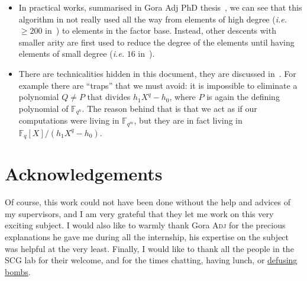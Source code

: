 \documentclass[a4paper,11pt]{article}
\theoremstyle{break}
\theoremstyle{sc}
\theoremstyle{definition}
\theoremstyle{remark}
\newcommand{\ie}{\emph{i.e. }}
\begin{document}
\begin{itemize}
  \item In practical works, summarised in Gora Adj PhD thesis~\cite{Adj16}, we
    can see that this algorithm in not really used all the way from elements
    of high degree (\ie $\geq 200$ in~\cite{Adj16}) to elements in the factor base. Instead, other descents
    with smaller arity are first used to reduce the degree of the elements
    until having elements of small degree (\ie $16$ in~\cite{Adj16}).
  \item There are technicalities hidden in this document, they are discussed
    in~\cite{GKZ14}. For example there are ``traps'' that we must avoid: it is
    impossible to eliminate a polynomial $Q\neq P$ that divides
    $h_1X^q-h_0$, where $P$ is again the defining polynomial of
    $\mathbb{F}_{q^n}$. The reason behind that is that we act as if our
    computations were living in $\mathbb{F}_{q^m}$, but they are in fact living
    in $\mathbb{F}_{q}[X]/(h_1X^q-h_0)$.
\end{itemize}

\section*{Acknowledgements}

Of course, this work could not have been done without the help and advices of my
supervisors, and I am very grateful that they let me work on this very exciting
subject. I would also like to warmly thank Gora \textsc{Adj} for the
precious explanations he gave me during all the internship, his expertise on the
subject was helpful at the very least. Finally, I would like to thank all the
people in the SCG lab for their welcome, and for the times chatting, having
lunch, or \href{http://www.keeptalkinggame.com/}{defusing bombs}.



\end{document}
